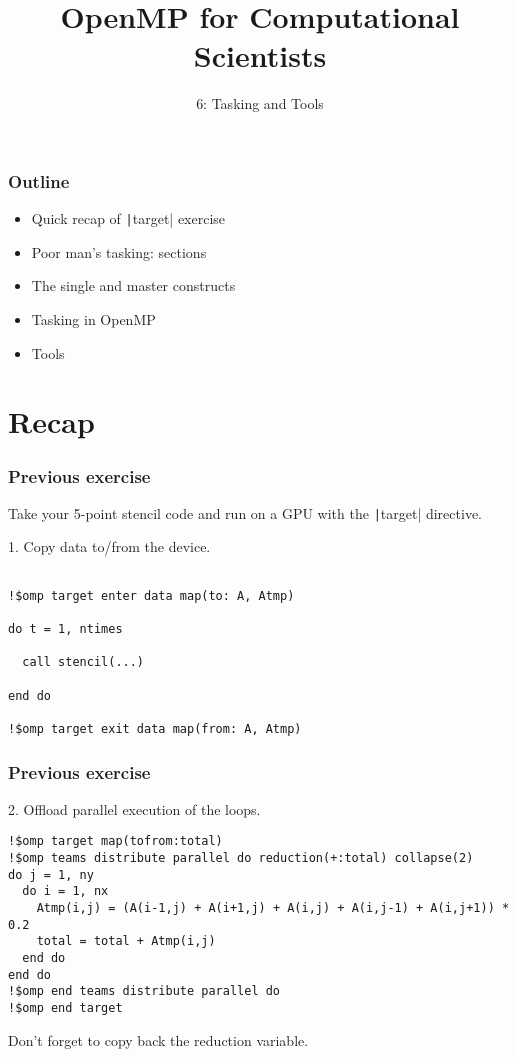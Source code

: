 \documentclass{beamer}
\title{OpenMP for Computational Scientists}
\subtitle{6: Tasking and Tools}
\begin{document}
\frame{\titlepage}

\begin{frame}
\frametitle{Outline}

\begin{itemize}
  \item Quick recap of \texttt|target| exercise
\end{itemize}

\begin{itemize}
  \item Poor man's tasking: sections
  \item The single and master constructs
  \item Tasking in OpenMP
  \item Tools
\end{itemize}
\end{frame}

\section{Recap}
\begin{frame}[fragile]
\frametitle{Previous exercise}

Take your 5-point stencil code and run on a GPU with the \texttt|target| directive.

1. Copy data to/from the device.
\begin{verbatim}

!$omp target enter data map(to: A, Atmp)

do t = 1, ntimes

  call stencil(...)

end do

!$omp target exit data map(from: A, Atmp)
\end{verbatim}

\end{frame}

\begin{frame}[fragile]
\frametitle{Previous exercise}

2. Offload parallel execution of the loops.
\begin{verbatim}
!$omp target map(tofrom:total)
!$omp teams distribute parallel do reduction(+:total) collapse(2)
do j = 1, ny
  do i = 1, nx
    Atmp(i,j) = (A(i-1,j) + A(i+1,j) + A(i,j) + A(i,j-1) + A(i,j+1)) * 0.2
    total = total + Atmp(i,j)
  end do
end do
!$omp end teams distribute parallel do
!$omp end target
\end{verbatim}

Don't forget to copy back the reduction variable.

\end{frame}
\end{document}
